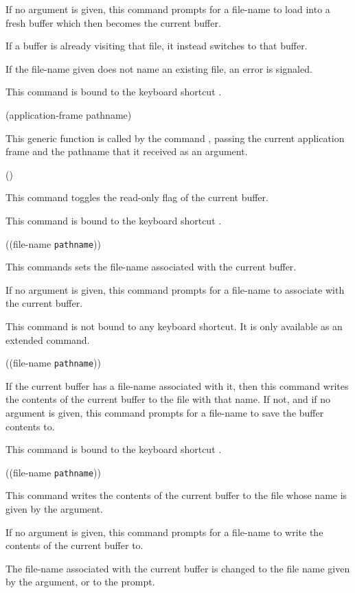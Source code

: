 If no argument is given, this command prompts for a file-name to load
into a fresh buffer which then becomes the current buffer.

If a buffer is already visiting that file, it instead switches to that
buffer.

If the file-name given does not name an existing file, an error is
signaled.

This command is bound to the keyboard shortcut .

 {(application-frame pathname)}

This generic function is called by the command
, passing the current application
frame and the pathname that it received as an argument.

 {()}

This command toggles the read-only flag of the current buffer.

This command is bound to the keyboard shortcut .

 {((file-name
  \texttt{pathname}))}

This commands sets the file-name associated with the current buffer.

If no argument is given, this command prompts for a file-name to
associate with the current buffer.

This command is not bound to any keyboard shortcut.  It is only
available as an extended command.

 {((file-name \texttt{pathname}))}

If the current buffer has a file-name associated with it, then this
command writes the contents of the current buffer to the file with
that name.  If not, and if no argument is given, this command prompts
for a file-name to save the buffer contents to.

This command is bound to the keyboard shortcut .

 {((file-name \texttt{pathname}))}

This command writes the contents of the current buffer to the file
whose name is given by the argument.

If no argument is given, this command prompts for a file-name to
write the contents of the current buffer to.

The file-name associated with the current buffer is changed to the
file name given by the argument, or to the prompt.

